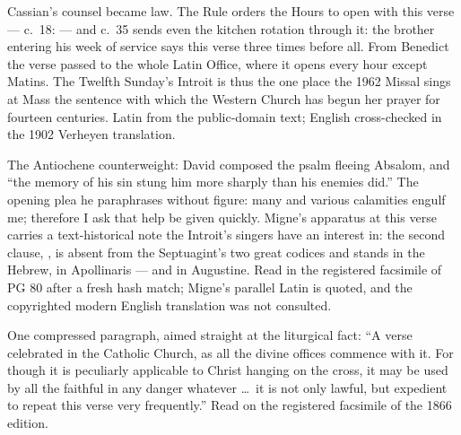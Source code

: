 \begin{witnessnote}
Cassian's counsel became law. The Rule orders the Hours to open with this
verse --- c.~18:  --- and c.~35 sends even the
kitchen rotation through it: the brother entering his week of service says
this verse three times before all. From Benedict the verse passed to the
whole Latin Office, where it opens every hour except Matins. The Twelfth
Sunday's Introit is thus the one place the 1962 Missal sings at Mass the
sentence with which the Western Church has begun her prayer for fourteen
centuries. Latin from the public-domain text; English cross-checked in the
1902 Verheyen translation.
\end{witnessnote}

\begin{witnessnote}
The Antiochene counterweight: David composed the psalm fleeing Absalom, and
``the memory of his sin stung him more sharply than his enemies did.'' The
opening plea he paraphrases without figure: many and various calamities
engulf me; therefore I ask that help be given quickly. Migne's apparatus at
this verse carries a text-historical note the Introit's singers have an
interest in: the second clause, , is
absent from the Septuagint's two great codices and stands in the Hebrew, in
Apollinaris --- and in Augustine. Read in the registered facsimile of PG 80
after a fresh hash match; Migne's parallel Latin is quoted, and the
copyrighted modern English translation was not consulted.
\end{witnessnote}

\begin{witnessnote}
One compressed paragraph, aimed straight at the liturgical fact: ``A verse
celebrated in the Catholic Church, as all the divine offices commence with
it. For though it is peculiarly applicable to Christ hanging on the cross, it
may be used by all the faithful in any danger whatever \dots\ it is not only
lawful, but expedient to repeat this verse very frequently.'' Read on the
registered facsimile of the 1866 edition.
\end{witnessnote}

